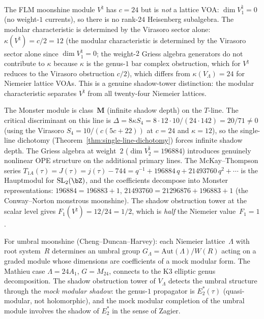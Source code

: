 \begin{remark}%
\label{rem:lattice:monster-shadow}%
%
%
The FLM moonshine module $V^\natural$ has $c = 24$ but is
\emph{not} a lattice VOA: $\dim V_1^\natural = 0$
(no weight-$1$ currents), so there is no rank-$24$ Heisenberg
subalgebra. The modular characteristic is determined by the
Virasoro sector alone:
$\kappa(V^\natural) = c/2 = 12$
(the modular characteristic is determined by the
Virasoro sector alone since $\dim V_1^\natural = 0$;
the weight-$2$ Griess algebra generators do not contribute
to $\kappa$ because $\kappa$ is the genus-$1$ bar complex
obstruction, which for $V^\natural$ reduces to the Virasoro
obstruction $c/2$),
which differs from $\kappa(V_\Lambda) = 24$ for Niemeier
lattice VOAs. This is a genuine shadow-tower distinction:
the modular characteristic separates $V^\natural$ from all
twenty-four Niemeier lattices.

The Monster module is class~$\mathbf{M}$ (infinite shadow depth)
on the $T$-line. The critical discriminant on this line is
$\Delta = 8\kappa S_4 = 8 \cdot 12 \cdot 10/(24 \cdot 142)
= 20/71 \neq 0$
(using the Virasoro $S_4 = 10/(c(5c{+}22))$ at $c = 24$
and $\kappa = 12$), so the single-line dichotomy
(Theorem~\ref{thm:single-line-dichotomy}) forces infinite shadow depth.
The Griess algebra at weight~$2$
($\dim V_2^\natural = 196884$) introduces genuinely nonlinear
OPE structure on the additional primary lines.
The McKay--Thompson series
$T_{1A}(\tau) = J(\tau) = j(\tau) - 744 = q^{-1} + 196884\,q
+ 21493760\,q^2 + \cdots$
is the Hauptmodul for $\mathrm{SL}_2(\bZ)$, and the
coefficients decompose into Monster representations:
$196884 = 196883 + 1$, $21493760 = 21296876 + 196883 + 1$
(the Conway--Norton monstrous moonshine).
The shadow obstruction tower at the scalar level gives
$F_1(V^\natural) = 12/24 = 1/2$, which is \emph{half} the
Niemeier value~$F_1 = 1$.

For umbral moonshine (Cheng--Duncan--Harvey):
each Niemeier lattice~$\Lambda$ with root system~$R$
determines an umbral group
$G_\Lambda = \mathrm{Aut}(\Lambda)/W(R)$
acting on a graded module whose dimensions are coefficients
of a mock modular form. The Mathieu case
$\Lambda = 24A_1$, $G = M_{24}$, connects to the K3
elliptic genus decomposition. The shadow obstruction tower of
$V_\Lambda$ detects the umbral structure through the
\emph{mock modular shadow}: the genus-$1$ propagator is
$E_2^*(\tau)$ (quasi-modular, not holomorphic), and the mock modular
completion of the umbral module involves the shadow of
$E_2^*$ in the sense of Zagier.
\end{remark}

